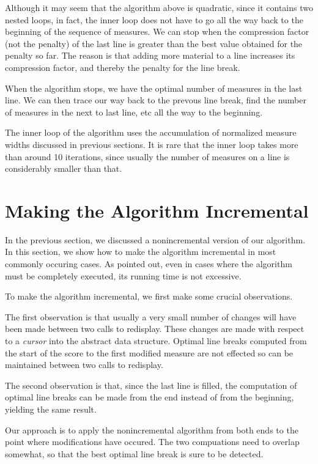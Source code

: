 \documentclass{article}
\begin{document}
Although it may seem that the algorithm above is quadratic, since it
contains two nested loops, in fact, the inner loop does not have to go
all the way back to the beginning of the sequence of measures.  We can
stop when the compression factor (not the penalty) of the last line is
greater than the best value obtained for the penalty so far.  The
reason is that adding more material to a line increases its
compression factor, and thereby the penalty for the line break.

When the algorithm stops, we have the optimal number of measures in
the last line.  We can then trace our way back to the prevous line
break, find the number of measures in the next to last line, etc all
the way to the beginning.  

The inner loop of the algorithm uses the accumulation of normalized
measure widths discussed in previous sections.  It is rare that the
inner loop takes more than around 10 iterations, since usually the
number of measures on a line is considerably smaller than that.

\section{Making the Algorithm Incremental}

In the previous section, we discussed a nonincremental version of our
algorithm.  In this section, we show how to make the algorithm
incremental in most commonly occuring cases.  As pointed out, even in
cases where the algorithm must be completely executed, its running
time is not excessive. 

To make the algorithm incremental, we first make some crucial
observations.

The first observation is that usually a very small number of changes
will have been made between two calls to redisplay.  These changes are
made with respect to a \emph{cursor} into the abstract data
structure.  Optimal line breaks computed from the start of the score
to the first modified measure are not effected so can be maintained
between two calls to redisplay.

The second observation is that, since the last line is filled, the
computation of optimal line breaks can be made from the end instead of
from the beginning, yielding the same result. 

Our approach is to apply the nonincremental algorithm from both ends
to the point where modifications have occured.  The two compuations
need to overlap somewhat, so that the best optimal line break is sure
to be detected.  
\end{document}
